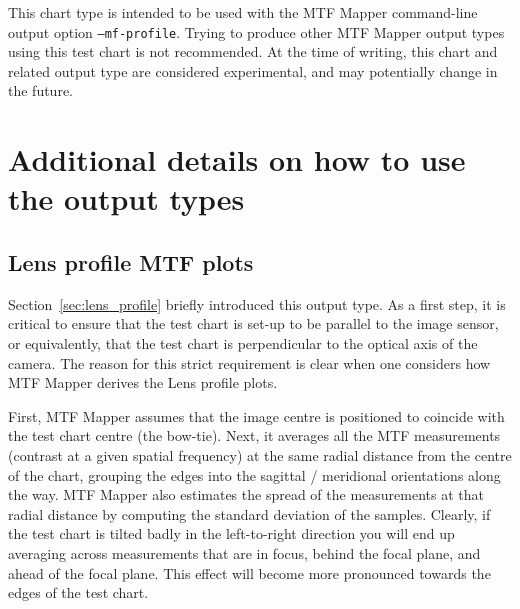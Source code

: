 \documentclass[a4paper]{article}
\begin{document}
This chart type is intended to be used with the MTF Mapper command-line
output option \texttt{--mf-profile}. 
Trying to produce other MTF Mapper output types using this test chart is not recommended.
At the time of writing, this chart and related output type are considered
experimental, and may potentially change in the future.

\newpage

\section{Additional details on how to use the output types}

\subsection{Lens profile MTF plots}
Section~\ref{sec:lens_profile} briefly introduced this output type. As a
first step, it is critical to ensure that the test chart is set-up to be
parallel to the image sensor, or equivalently, that the test chart is
perpendicular to the optical axis of the camera. The reason for this strict
requirement is clear when one considers how MTF Mapper derives the
\textsf{Lens profile} plots.

First, MTF Mapper assumes that the image centre is positioned to coincide
with the test chart centre (the bow-tie). Next, it averages all the MTF
measurements (contrast at a given spatial frequency) at the same radial
distance from the centre of the chart, grouping the edges into the sagittal
/ meridional orientations along the way. MTF Mapper also estimates the
spread of the measurements at that radial distance by computing the standard
deviation of the samples. Clearly, if the test chart is tilted badly in the
left-to-right direction you will end up averaging across measurements that
are in focus, behind the focal plane, and ahead of the focal plane. This
effect will become more pronounced towards the edges of the test chart.
\end{document}
